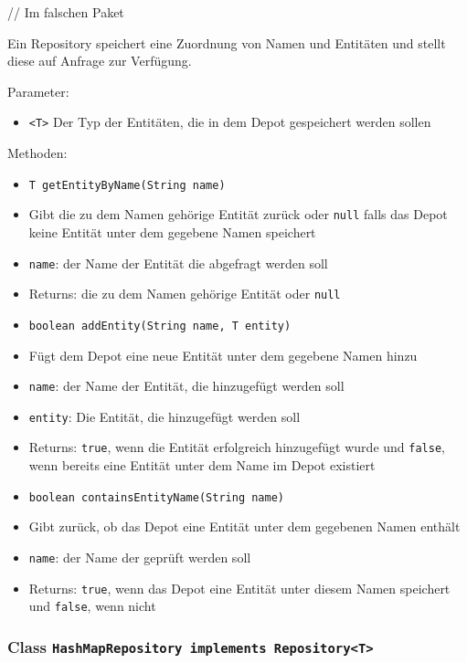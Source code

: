 \documentclass[parskip=full,11pt]{scrartcl}
\begin{document}
// Im falschen Paket

Ein Repository speichert eine Zuordnung von Namen und Entitäten und stellt diese auf Anfrage zur Verfügung.

Parameter:
\begin{itemize}\itemsep -10pt
	\item \texttt{<T>} Der Typ der Entitäten, die in dem Depot gespeichert werden sollen
\end{itemize}


Methoden:
\begin{itemize}\itemsep -10pt
	\item \texttt{T getEntityByName(String name)}
	\item[] Gibt die zu dem Namen gehörige Entität zurück oder \texttt{null} falls das Depot keine Entität unter dem gegebene Namen speichert
	\item[] \texttt{name}: der Name der Entität die abgefragt werden soll
	\item[] Returns: die zu dem Namen gehörige Entität oder \texttt{null}
	
	\item \texttt{boolean addEntity(String name, T entity)}
	\item[] Fügt dem Depot eine neue Entität unter dem gegebene Namen hinzu
	\item[] \texttt{name}: der Name der Entität, die hinzugefügt werden soll
	\item[] \texttt{entity}: Die Entität, die hinzugefügt werden soll
	\item[] Returns: \texttt{true}, wenn die Entität erfolgreich hinzugefügt wurde und \texttt{false}, wenn bereits eine Entität unter dem Name im Depot existiert 
	
	\item \texttt{boolean containsEntityName(String name)}
	\item[] Gibt zurück, ob das Depot eine Entität unter dem gegebenen Namen enthält
	\item[] \texttt{name}: der Name der geprüft werden soll
	\item[] Returns: \texttt{true}, wenn das Depot eine Entität unter diesem Namen speichert und \texttt{false}, wenn nicht
	
\end{itemize}

\subsubsection{Class \texttt{HashMapRepository implements Repository<T>}}
\end{document}
